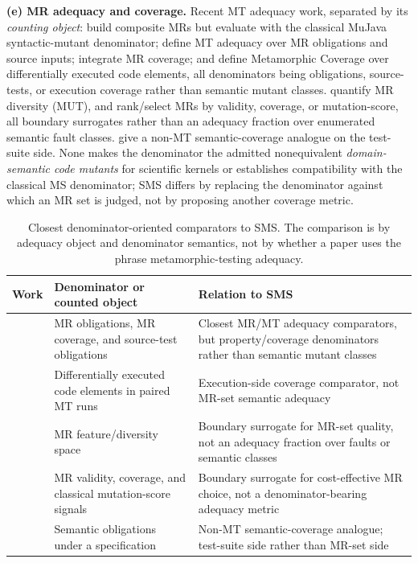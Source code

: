 \documentclass[manuscript,screen,review]{acmart}
\begin{document}
\textbf{(e) MR adequacy and coverage.} Recent MT adequacy work, separated by its
\emph{counting object}: \citet{xiang2019compositeMR} build composite MRs but
evaluate with the classical MuJava syntactic-mutant denominator;
\citet{fu2024mtadequacy} define MT adequacy over MR obligations and source
inputs; \citet{liu2024mtcoverage} integrate MR coverage; and
\citet{ba2025metamorphiccoverage} define Metamorphic Coverage over
differentially executed code elements, all denominators being obligations,
source-tests, or execution coverage rather than semantic mutant classes.
\citet{xie2024mutmodel} quantify MR diversity (MUT), and
\citet{huang2022mrprioritization,zhang2022effectivemrselection} rank/select MRs
by validity, coverage, or mutation-score, all boundary surrogates rather than an
adequacy fraction over enumerated semantic fault classes.
\citet{alblwi2023semanticcoverage} give a non-MT semantic-coverage analogue on
the test-suite side. None makes the denominator the admitted nonequivalent
\emph{domain-semantic code mutants} for scientific kernels or establishes
compatibility with the classical MS denominator; SMS differs by replacing the
denominator against which an MR set is judged, not by proposing another coverage
metric.

\begin{table}[t]
\centering
\footnotesize
\caption{Closest denominator-oriented comparators to SMS. The comparison
is by adequacy object and denominator semantics, not by whether a paper
uses the phrase metamorphic-testing adequacy.}
\label{tab:closest-denominator-comparators}
\begin{tabular}{p{}p{}p{}}
\toprule
Work & Denominator or counted object & Relation to SMS \\
\midrule
\citep{fu2024mtadequacy,liu2024mtcoverage} & MR obligations, MR coverage, and source-test obligations & Closest MR/MT adequacy comparators, but property/coverage denominators rather than semantic mutant classes \\
\citep{ba2025metamorphiccoverage} & Differentially executed code elements in paired MT runs & Execution-side coverage comparator, not MR-set semantic adequacy \\
\citep{xie2024mutmodel} & MR feature/diversity space & Boundary surrogate for MR-set quality, not an adequacy fraction over faults or semantic classes \\
\citep{huang2022mrprioritization,zhang2022effectivemrselection} & MR validity, coverage, and classical mutation-score signals & Boundary surrogate for cost-effective MR choice, not a denominator-bearing adequacy metric \\
\citep{alblwi2023semanticcoverage} & Semantic obligations under a specification & Non-MT semantic-coverage analogue; test-suite side rather than MR-set side \\
\bottomrule
\end{tabular}
\end{table}
\end{document}
